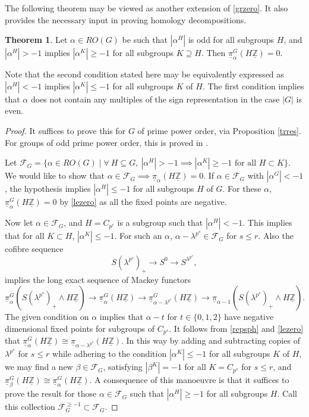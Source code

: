 \documentclass[a4paper,leqno,11pt]{amsart}
\theoremstyle{plain}
\theoremstyle{definition}
\newtheorem{thm}[theorem]{Theorem}
\theoremstyle{remark}
\theoremstyle{definition}
\newcommand{\upi}{\underline{\pi}}
\newcommand\FF{{\mathcal F}}
\newenvironment{myeq}[1][]
{\stepcounter{theorem}\begin{equation}\tag{\thetheorem}{#1}}
	{\end{equation}}
\newcommand{\uZ}{\underline{\mathbb{Z}}}
\numberwithin{equation}{section}
\begin{document}
	The following theorem may be viewed as another extension of \eqref{grzero}. It also provides the necessary input in proving homology decompositions. 
	\begin{thm}\label{thm:BG Cn}
		Let $ \alpha\in RO(G) $ be such that $ |\alpha^H| $ is odd for all subgroups $H$, and $|\alpha^H|>-1$ implies $|\alpha^K|\ge -1 $ for all subgroups $ K\supseteq H $. Then $ \upi_{\alpha}^{G}(H\uZ )=0$.
	\end{thm}	
	Note that the second condition stated here may  be equivalently expressed as $|\alpha^H|<-1$ implies $|\alpha^K|\leq -1$ for all subgroups $K$ of $H$. The first condition implies that $\alpha$ does not contain any multiples of the sign representation in the case $|G|$ is even.
	
	\begin{proof}
	It suffices to prove this for $G$ of prime power order, via Proposition \ref{trres}. For groups of odd prime power order, this is proved in \cite{BasuDeyKarmakar-NYJM}. 
	
	
	
	
	Let $\FF_G=\{\alpha\in RO(G) \mid \forall~ H \subseteq G,~ |\alpha^H|>-1 \implies	|\alpha^K|\geq -1 \mbox{ for all } H\subset K \}$. We would like to show that $\alpha\in \FF_G \implies \upi_\alpha(H\uZ)=0$. If $\alpha\in \FF_G$ with $|\alpha^G|<-1$, the hypothesis implies $|\alpha^H|\leq -1$ for all subgroups $H$ of $G$. For these $\alpha$, $\upi_\alpha^G(H\uZ)=0$ by \eqref{lezero} as all the fixed points are negative. 
	
	Now let $\alpha\in \FF_G$, and $H=C_{p^r}$ is a subgroup such that $|\alpha^H|<-1$. This implies that for all $K\subset H$, $|\alpha^K|\leq -1$. For such an $\alpha$, $\alpha-\lambda^{p^s} \in \FF_G$ for $s\leq r$. Also the cofibre sequence 
	\[ S(\lambda^{p^s})_+ \to S^0 \to S^{\lambda^{p^s}},\]
	implies the long exact sequence of Mackey functors 
	\begin{myeq}\label{longex}
	 \upi_{\alpha}^G(  S(\lambda^{p^s})_+\wedge H\uZ) \to \upi_\alpha^G ( H\uZ)\to \upi^G_{\alpha - \lambda^{p^s}}( H\uZ)\to \upi_{\alpha - 1}(  S(\lambda^{p^s})_+\wedge H\uZ).
	 \end{myeq}
	The given condition on $\alpha$ implies that  $\alpha-t$ for $t\in \{0,1,2\}$ have negative dimensional fixed points for subgroups of $C_{p^s}$. It follows from \eqref{repsph} and \eqref{lezero} that $\upi_\alpha^G(H\uZ)\cong \upi_{\alpha-\lambda^{p^s}}(H\uZ)$. In this way by adding and subtracting copies of $\lambda^{p^s}$ for $s\leq r$ while adhering to the condition $|\alpha^K|\leq -1$ for all subgroups $K$ of $H$, we may find a new $\beta \in \FF_G$, satisfying $|\beta^K|=-1$ for all $K=C_{p^s}$ for $s\leq r$, and $\upi_\beta^G(H\uZ)\cong \upi_\alpha^G(H\uZ)$. A consequence of this manoeuvre is that it suffices to prove the result for those $\alpha \in \FF_G$ such that $|\alpha^H|\geq -1$ for all subgroups $H$. Call this collection $\FF_G^{\geq -1}\subset \FF_G$.
	

\end{proof}
\end{document}
